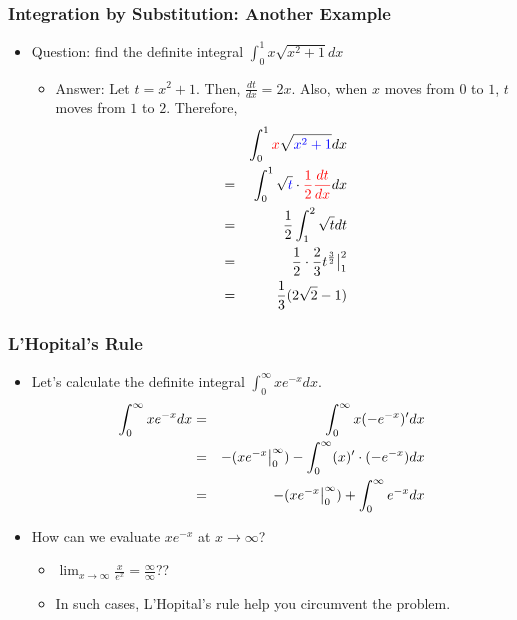 \documentclass[pdflatex, 12pt]{beamer}
\begin{document}
\begin{frame}
\frametitle{Integration by Substitution: Another Example}
\begin{itemize}
\item Question: find the definite integral $\int^1_0 x\sqrt{x^2 + 1}dx$
\vspace{0.4cm}
 \begin{itemize}
 \item Answer: Let $t = x^2 + 1$. Then, $\frac{dt}{dx} = 2x$. Also, when $x$ moves from $0$ to $1$, $t$ moves from $1$ to $2$. Therefore,
  \begin{eqnarray}
  && \int^1_0 {\color{red} x}\sqrt{\color{blue} x^2 + 1}dx \notag \\
  &=& \int^1_0 \sqrt{\color{blue} t} \cdot {\color{red} \frac{1}{2}\frac{dt}{dx}} dx \notag \\
  &=& \frac{1}{2} \int^2_1 \sqrt{t} dt \notag \\
  &=& \frac{1}{2} \cdot \frac{2}{3} t^{\frac{3}{2}}\big|^2_1 \notag \\
  &=& \frac{1}{3} (2\sqrt{2} - 1) \notag 
  \end{eqnarray}
 \end{itemize}
\end{itemize}
\end{frame}

\begin{frame}
\frametitle{L'Hopital's Rule}
\begin{itemize}
\item Let's calculate the definite integral $\int^{\infty}_0 xe^{-x} dx$.
 \begin{eqnarray}
 \int^{\infty}_0 xe^{-x} dx &=& \int^{\infty}_0 x(-e^{-x})' dx \notag \\
 &=& -(xe^{-x}\big|^{\infty}_0)  - \int^{\infty}_0 (x)' \cdot (-e^{-x}) dx \notag \\
 &=& -(xe^{-x}\big|^{\infty}_0)  + \int^{\infty}_0 e^{-x} dx \notag
 \end{eqnarray}
\item How can we evaluate $xe^{-x}$ at $x \to \infty$?
 \begin{itemize}
 \item $\lim_{x \to \infty} \frac{x}{e^x} = \frac{\infty}{\infty}$??
 \item In such cases, L'Hopital's rule help you circumvent the problem.
 \end{itemize}
\end{itemize}
\end{frame}
\end{document}
